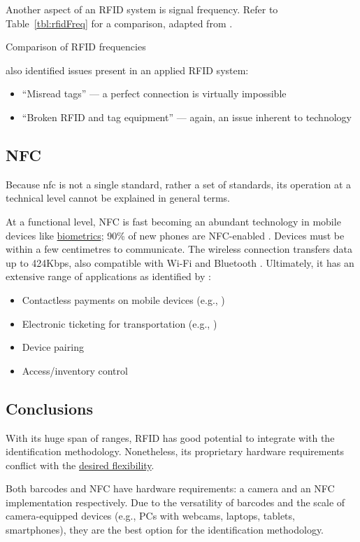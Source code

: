 Another aspect of an RFID system is signal frequency.
Refer to Table~\ref{tbl:rfidFreq} for a comparison, adapted
from \cite{whatIsRfid}.

\begin{table}[ht]
  \centering
  
  \caption{Comparison of RFID frequencies}
  \label{tbl:rfidFreq}
\end{table}

\cite{barcodeRfidComparison} also identified issues present
in an applied RFID system:

\begin{itemize}

  \item \enquote{Misread tags} --- a perfect
        connection is virtually impossible

  \item \enquote{Broken RFID and tag equipment}
        --- again, an issue inherent to technology

\end{itemize}

\subsection{NFC} \label{ss:nfc}

Because \gls{nfc} is not a single standard, rather a set of
standards, its operation at a technical level cannot be
explained in general terms.

At a functional level, NFC is fast becoming an abundant
technology in mobile devices like
\hyperref[ss:biometrics]{biometrics}; 90\% of new phones
are NFC-enabled \parencite{nfcHandsetStats}.
Devices must be within a few centimetres to communicate.
The wireless connection transfers data up to 424Kbps, also
compatible with Wi-Fi and Bluetooth \parencite{nfc}.
Ultimately, it has an extensive range of applications as
identified by \cite{nfc}: 

\begin{itemize} \item Contactless payments on mobile
        devices (e.g., \cite{androidPayWithPhone, applePay}) \item
        Electronic ticketing for transportation (e.g.,
        \cite{digitalTickets}) \item Device pairing \item
        Access/inventory control \end{itemize} 

\subsection{Conclusions} 

With its huge span of ranges, RFID has good potential to
integrate with the identification methodology.
Nonetheless, its proprietary hardware requirements conflict
with the \hyperref[ss:goal]{desired flexibility}.

Both barcodes and NFC have hardware requirements: a camera
and an NFC implementation respectively.
Due to the versatility of barcodes and the scale of
camera-equipped devices (e.g., PCs with webcams, laptops,
tablets, smartphones), they are the best option for the
identification methodology.
